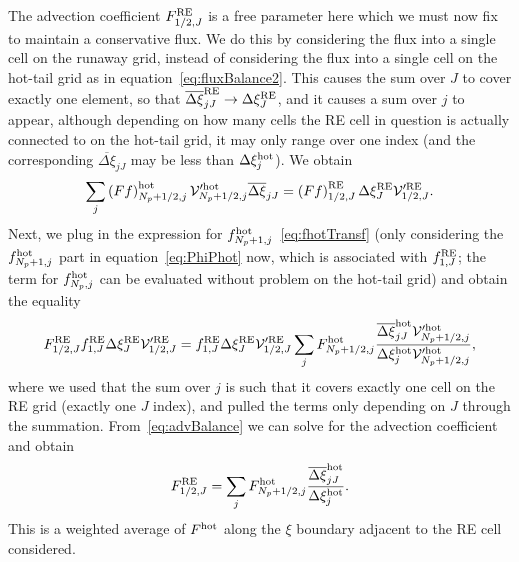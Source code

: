 \documentclass{notes}
\newcommand{\Vp}{\mathcal{V}'}
\begin{document}
    The advection coefficient $F^{\rm RE}_{1/2,J}$ is a free parameter here
    which we must now fix to maintain a conservative flux. We do this by
    considering the flux into a single cell on the runaway grid, instead of
    considering the flux into a single cell on the hot-tail grid as in
    equation~\eqref{eq:fluxBalance2}. This causes the sum over $J$ to cover
    exactly one element, so that $\overline{\Delta\xi}_{jJ}^{\rm RE}\to\Delta\xi_J^{\rm RE}$,
    and it causes a sum over $j$ to appear, although depending on how many cells
    the RE cell in question is actually connected to on the hot-tail grid, it
    may only range over one index (and the corresponding
    $\overline{\Delta\xi}_{jJ}$ may be less than $\Delta\xi^{\rm hot}_j$). We
    obtain
    \begin{equation}
        \sum_j \left( Ff \right)^{\rm hot}_{N_p+1/2,j} \Vp^{\rm hot}_{N_p+1/2,j} \overline{\Delta\xi}_{jJ} =
        \left( F f \right)^{\rm RE}_{1/2,J} \Delta\xi^{\rm RE}_J\Vp^{\rm RE}_{1/2,J}.
    \end{equation}
    Next, we plug in the expression for
    $f^{\rm hot}_{N_p+1,j}$~\eqref{eq:fhotTransf} (only considering the
    $f^{\rm hot}_{N_p+1,j}$ part in equation~\eqref{eq:PhiPhot} now, which is
    associated with $f^{\rm RE}_{1,J}$; the term for $f^{\rm hot}_{N_p,j}$ can be
    evaluated without problem on the hot-tail grid) and obtain the equality
    \begin{equation}\label{eq:advBalance}
        F^{\rm RE}_{1/2,J} f^{\rm RE}_{1,J} \Delta\xi^{\rm RE}_J\Vp^{\rm RE}_{1/2,J} =
        f_{1,J}^{\rm RE}\Delta\xi^{\rm RE}_J\Vp^{\rm RE}_{1/2,J}
        \sum_j F^{\rm hot}_{N_p+1/2,j} \frac{\overline{\Delta\xi}^{\rm hot}_{jJ}\Vp^{\rm hot}_{N_p+1/2,j}}
        {\Delta\xi^{\rm hot}_j\Vp^{\rm hot}_{N_p+1/2,j}},
    \end{equation}
    where we used that the sum over $j$ is such that it covers exactly one
    cell on the RE grid (exactly one $J$ index), and pulled the terms only
    depending on $J$ through the summation. From~\eqref{eq:advBalance} we can
    solve for the advection coefficient and obtain
    \begin{equation}\label{eq:avAdvection}
        F_{1/2,J}^{\rm RE} = \sum_j F^{\rm hot}_{N_p+1/2,j}
        \frac{\overline{\Delta\xi}^{\rm hot}_{jJ}}{\Delta\xi_j^{\rm hot}}.
    \end{equation}
    This is a weighted average of $F^{\rm hot}$ along the $\xi$ boundary
    adjacent to the RE cell considered.
\end{document}
